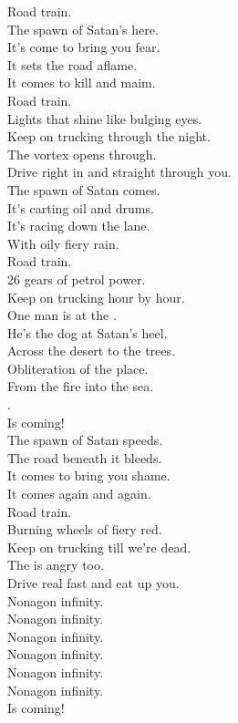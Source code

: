 Road train. \\

The spawn of Satan's here. \\
It's come to bring you fear. \\
It sets the road aflame. \\
It comes to kill and maim. \\

Road train. \\

Lights that shine like bulging eyes. \\
Keep on trucking through the night. \\
The vortex opens through. \\
Drive right in and straight through you. \\

The spawn of Satan comes. \\
It's carting oil and drums. \\
It's racing down the lane. \\
With oily fiery rain. \\

Road train. \\

26 gears of petrol power. \\
Keep on trucking hour by hour. \\
One man is at the . \\
He's the dog at Satan's heel. \\

Across the desert to the trees. \\
Obliteration of the place. \\
From the fire into the sea. \\
. \\
Is coming! \\

The spawn of Satan speeds. \\
The road beneath it bleeds. \\
It comes to bring you shame. \\
It comes again and again. \\

Road train. \\

Burning wheels of fiery red. \\
Keep on trucking till we're dead. \\
The  is angry too. \\
Drive real fast and eat up you. \\

Nonagon infinity. \\
Nonagon infinity. \\
Nonagon infinity. \\
Nonagon infinity. \\
Nonagon infinity. \\
Nonagon infinity. \\
Is coming! \\

